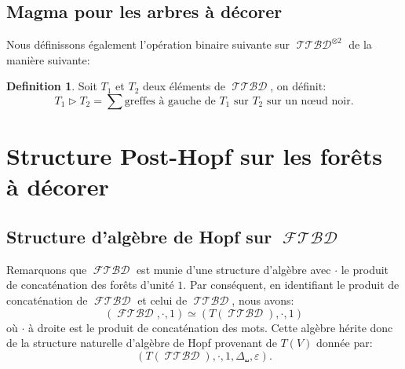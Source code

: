 \documentclass[french]{article}
\theoremstyle{definition}
\newtheorem{defi}{Definition}[section]
\theoremstyle{plain}
\newcommand{\e}{\varepsilon}
\DeclareMathOperator{\FTBD}{\mathcal{FTBD}}
\DeclareMathOperator{\TTBD}{\mathcal{TTBD}}
\begin{document}
\subsection{Magma pour les arbres à décorer}

Nous définissons également l'opération binaire suivante sur $\TTBD^{\otimes 2}$ de la manière suivante:
\begin{defi}
	Soit $T_1$ et $T_2$ deux éléments de $\TTBD$, on définit:
	\[
	T_1\rhd T_2=\sum \text{greffes à gauche de } T_1 \text{ sur } T_2 \text{ sur un n\oe{}ud noir}.
	\]
\end{defi} 

\section{Structure Post-Hopf sur les forêts à décorer}

\subsection{Structure d'algèbre de Hopf sur $\FTBD$}

Remarquons que $\FTBD$ est munie d'une structure d'algèbre avec $\cdot$ le produit de concaténation des forêts d'unité $1$. Par conséquent, en identifiant le produit de concaténation de $\FTBD$ et celui de $\TTBD$, nous avons:
\[
(\FTBD,\cdot, 1)\simeq (T(\TTBD),\cdot, 1)
\]
où $\cdot$ à droite est le produit de concaténation des mots. Cette algèbre hérite donc de la structure naturelle d'algèbre de Hopf provenant de $T(V)$ donnée par:
\[
(T(\TTBD),\cdot, 1,\Delta_{\shuffle},\e).
\]
\end{document}
